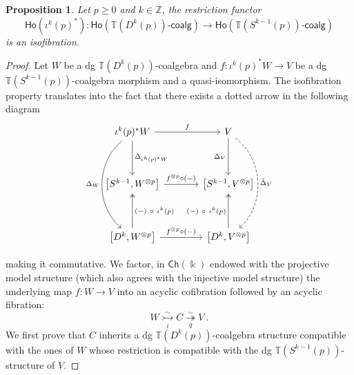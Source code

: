\documentclass{proc-l}
\newcommand{\ho}[1]{\mathsf{Ho}(#1)}
\newcommand{\onecoalg}[1]{#1\text{-}\mathsf{coalg}}
\theoremstyle{plain}
\newtheorem{proposition}[{theorem}]{Proposition}
\theoremstyle{definition}
\theoremstyle{remark}
\newcommand{\kk}{\Bbbk}
\begin{document}
\begin{proposition}%
\label{Proposition:4.14}\label{prop: isofibration}
Let $p \geq 0$ and $k \in \mathbb{Z}$, the restriction functor
\[
\ho{\iota^k(p)^*}: \ho{\onecoalg{\mathbb{T}(D^{k}(p))}} \longrightarrow \ho{\onecoalg{\mathbb{T}(S^{k-1}(p))}}
\]
is an isofibration.
\end{proposition}

\begin{proof}
Let $W$ be a dg $\mathbb{T}(D^k(p))$-coalgebra and $f:\iota^k(p)^*W \longrightarrow V$ be a dg $\mathbb{T}(S^{k-1}(p))$-coalgebra morphism and a quasi-isomorphism. The isofibration property translates into the fact that there exists a dotted arrow in the following  diagram
\[
\begin{tikzcd}[row sep=3pc, column sep=3pc]
\iota^k(p)^* W  \arrow[d, "\Delta_{\iota^k(p)^*W}"] \arrow[r, "f"] \arrow[dd, bend right=50, "\Delta_W"']
&V \arrow[d, "\Delta_V"'] \arrow[dd, bend left=50, dashed, "\tilde{\Delta}_V"]\\
\left[S^{k-1}, W^{\otimes p}\right] \arrow[r, "f^{\otimes p}\circ (-)"]
&\left[S^{k-1}, V^{\otimes p}\right] \\
\left[D^k, W^{\otimes p}\right] \arrow[r, "f^{\otimes p}\circ (-)"] \arrow[u, two heads, "(-) ~ \circ ~ \iota^k(p)"']
&\left[D^k, V^{\otimes p}\right] \arrow[u, two heads, "(-) ~\circ ~\iota^k(p)"]
\end{tikzcd}
\]

making it commutative. We factor, in $\mathsf{Ch}(\kk)$ endowed with the projective model structure (which also agrees with the injective model structure) the underlying map $f: W\rightarrow V$ into an acyclic cofibration followed by an acyclic fibration:
\[
W\underset{i}{\stackrel{\sim}\rightarrowtail} C \underset{q}{\stackrel{\sim}\twoheadrightarrow} V~.
\]
We first prove that $C$ inherits a dg $\mathbb{T}(D^k(p))$-coalgebra structure compatible with the ones of $W$ whose restriction is compatible with the dg $\mathbb{T}(S^{k-1}(p))$-structure of $V$.


\end{proof}
\end{document}
